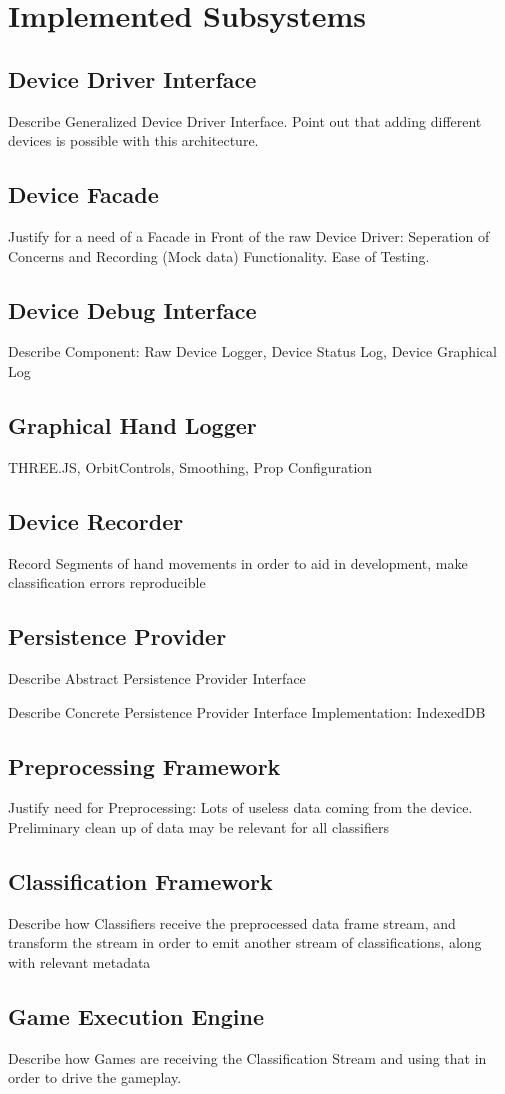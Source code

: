 \section{Implemented Subsystems}
\subsection{Device Driver Interface}
Describe Generalized Device Driver Interface. Point out that adding different devices is possible with this architecture.
\subsection{Device Facade}
Justify for a need of a Facade in Front of the raw Device Driver: Seperation of Concerns and Recording (Mock data) Functionality. Ease of Testing.
\subsection{Device Debug Interface}
Describe Component: Raw Device Logger, Device Status Log, Device Graphical Log
\subsection{Graphical Hand Logger}
THREE.JS, OrbitControls, Smoothing, Prop Configuration
\subsection{Device Recorder}
Record Segments of hand movements in order to aid in development, make classification errors reproducible
\subsection{Persistence Provider}
Describe Abstract Persistence Provider Interface

Describe Concrete Persistence Provider Interface Implementation: IndexedDB
\subsection{Preprocessing Framework}
Justify need for Preprocessing: Lots of useless data coming from the device. Preliminary
clean up of data may be relevant for all classifiers
\subsection{Classification Framework}
Describe how Classifiers receive the preprocessed data frame stream, and transform the stream in order to emit another stream of classifications, along with relevant metadata
\subsection{Game Execution Engine}
Describe how Games are receiving the Classification Stream and using that in order to drive the gameplay.

